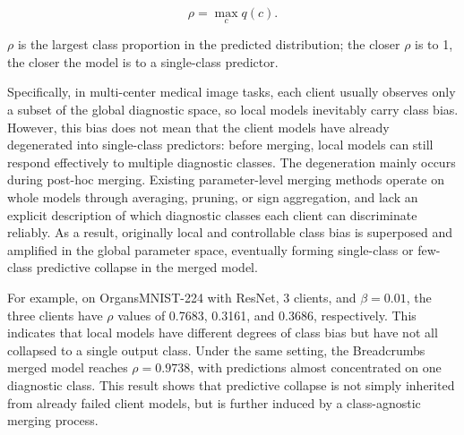 \documentclass[letterpaper]{article}
\begin{document}
\begin{equation}
\rho=\max_{c} q(c).
\end{equation}

$\rho$ is the largest class proportion in the predicted distribution; the closer $\rho$ is to 1, the closer the model is to a single-class predictor.


Specifically, in multi-center medical image tasks, each client usually observes only a subset of the global diagnostic space, so local models inevitably carry class bias. However, this bias does not mean that the client models have already degenerated into single-class predictors: before merging, local models can still respond effectively to multiple diagnostic classes. The degeneration mainly occurs during post-hoc merging. Existing parameter-level merging methods operate on whole models through averaging, pruning, or sign aggregation, and lack an explicit description of which diagnostic classes each client can discriminate reliably. As a result, originally local and controllable class bias is superposed and amplified in the global parameter space, eventually forming single-class or few-class predictive collapse in the merged model.


For example, on OrgansMNIST-224 with ResNet, 3 clients, and $\beta=0.01$, the three clients have $\rho$ values of 0.7683, 0.3161, and 0.3686, respectively. This indicates that local models have different degrees of class bias but have not all collapsed to a single output class. Under the same setting, the Breadcrumbs merged model reaches $\rho=0.9738$, with predictions almost concentrated on one diagnostic class. This result shows that predictive collapse is not simply inherited from already failed client models, but is further induced by a class-agnostic merging process.
\end{document}
